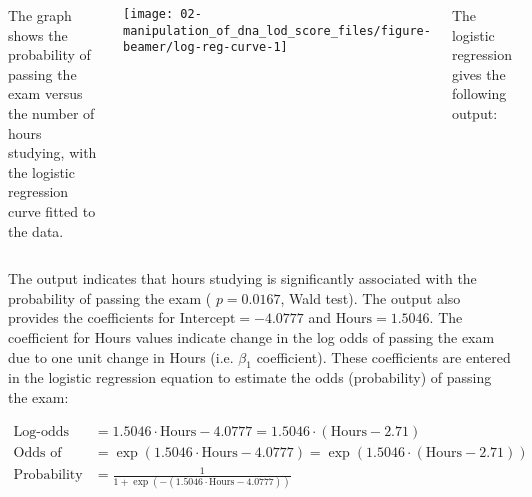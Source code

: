 \documentclass[11pt,dvipsnames,ignorenonframetext,aspectratio=169]{beamer}
\begin{document}
\begin{frame}{}
\protect\hypertarget{section-7}{}

\small

\begin{columns}[T,onlytextwidth]

The graph shows the probability of passing the exam versus the number of hours studying, with the logistic regression curve fitted to the data.


\begin{center}\texttt{[image: 02-manipulation\_of\_dna\_lod\_score\_files/figure-beamer/log-reg-curve-1]} \end{center}


The logistic regression gives the following output:

\begin{table}[H]
\centering
{}
\end{table}

\end{columns}

\end{frame}

\begin{frame}{}
\protect\hypertarget{section-8}{}

The output indicates that hours studying is significantly associated
with the probability of passing the exam ( \({\displaystyle p=0.0167}\),
Wald test). The output also provides the coefficients for
\({\displaystyle {\text{Intercept}}=-4.0777}\) and
\({\displaystyle {\text{Hours}}=1.5046}\). The coefficient for Hours
values indicate change in the log odds of passing the exam due to one
unit change in Hours (i.e. \(\beta_1\) coefficient). These coefficients
are entered in the logistic regression equation to estimate the odds
(probability) of passing the exam:

\[
{\displaystyle {\begin{aligned}{\text{Log-odds of passing exam}}&=1.5046\cdot {\text{Hours}}-4.0777=1.5046\cdot ({\text{Hours}}-2.71)\\{\text{Odds of passing exam}}&=\exp \left(1.5046\cdot {\text{Hours}}-4.0777\right)=\exp \left(1.5046\cdot ({\text{Hours}}-2.71)\right)\\{\text{Probability of passing exam}}&={\frac {1}{1+\exp \left(-\left(1.5046\cdot {\text{Hours}}-4.0777\right)\right)}}\end{aligned}}}
\]

\end{frame}
\end{document}
